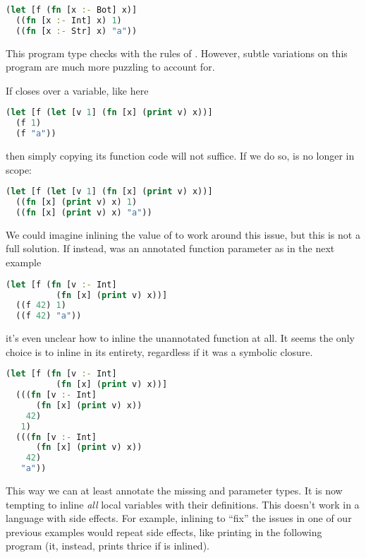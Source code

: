 \begin{lstlisting}[language=Clojure]
(let [f (fn [x :- Bot] x)]
  ((fn [x :- Int] x) 1)
  ((fn [x :- Str] x) "a"))
\end{lstlisting}

This program type checks with the rules of \ltiFsub.
However, subtle variations on this program are much
more puzzling to account for.

If  closes over a variable, like 
here

\begin{lstlisting}[language=Clojure]
(let [f (let [v 1] (fn [x] (print v) x))]
  (f 1)
  (f "a"))
\end{lstlisting}

then simply copying its function code will
not suffice.
If we do so,  is no longer in scope:

\begin{lstlisting}[language=Clojure]
(let [f (let [v 1] (fn [x] (print v) x))]
  ((fn [x] (print v) x) 1)
  ((fn [x] (print v) x) "a"))
\end{lstlisting}

We could imagine inlining the value of 
 to work around this issue, but this is not a
full solution.
If instead,  was an annotated function parameter
as in the next example

\begin{lstlisting}[language=Clojure]
(let [f (fn [v :- Int]
          (fn [x] (print v) x))]
  ((f 42) 1)
  ((f 42) "a"))
\end{lstlisting}

it's even unclear how to inline the
unannotated function at all.
It seems the only choice is to inline 
in its entirety, regardless if it was a symbolic closure.

\begin{lstlisting}[language=Clojure]
(let [f (fn [v :- Int]
          (fn [x] (print v) x))]
  (((fn [v :- Int]
      (fn [x] (print v) x))
    42)
   1)
  (((fn [v :- Int]
      (fn [x] (print v) x))
    42)
   "a"))
\end{lstlisting}

This way we can at least annotate the missing  and 
parameter types.
It is now tempting to inline \emph{all} local variables with their
definitions.
This doesn't work in a language with side effects.
For example, inlining  to ``fix'' the issues
in one of our previous examples would repeat side
effects, like printing  in the following
program (it, instead, prints thrice if  is inlined).

